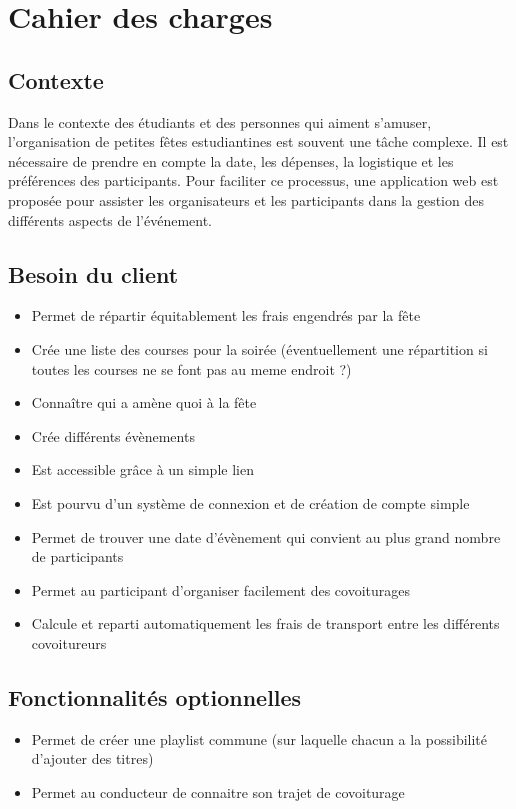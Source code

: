\section{Cahier des charges}\label{subsec:cahier-des-charges}

\subsection{Contexte}
Dans le contexte des étudiants et des personnes qui aiment s'amuser, l'organisation de petites fêtes estudiantines est souvent une tâche complexe.
Il est nécessaire de prendre en compte la date, les dépenses, la logistique et les préférences des participants.
Pour faciliter ce processus, une application web est proposée pour assister les organisateurs et les participants dans la gestion des différents aspects de l'événement.

\subsection{Besoin du client}\label{subsec:besoin-du-client}
\begin{itemize}
    \item Permet de répartir équitablement les frais engendrés par la fête
    \item Crée une liste des courses pour la soirée (éventuellement une répartition si toutes les courses ne se font pas au meme endroit ?)
    \item Connaître qui a amène quoi à la fête
    \item Crée différents évènements
    \item Est accessible grâce à un simple lien
    \item Est pourvu d'un système de connexion et de création de compte simple
    \item Permet de trouver une date d’évènement qui convient au plus grand nombre de participants
    \item Permet au participant d'organiser facilement des covoiturages
    \item Calcule et reparti automatiquement les frais de transport entre les différents covoitureurs
\end{itemize}
\subsection{Fonctionnalités optionnelles}\label{subsec:fonctionnalites-optionnelles}
\begin{itemize}
    \item Permet de créer une playlist commune (sur laquelle chacun a la possibilité d'ajouter des titres)
    \item Permet au conducteur de connaitre son trajet de covoiturage
\end{itemize}

